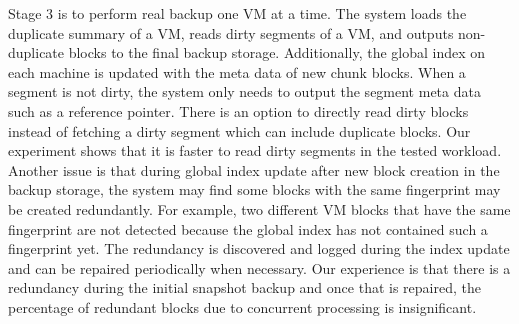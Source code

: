 Stage 3 is to perform real backup one VM at a time.
The system loads the duplicate summary of a VM, 
reads  dirty segments of a VM, and outputs non-duplicate blocks to the final backup 
storage. Additionally, the global index on each machine is updated with the meta data of new chunk blocks. 
When a segment is not dirty, the system only needs to output the segment meta data such as a reference pointer. 
There is an option to directly read dirty blocks instead of fetching a dirty segment which can include duplicate
blocks. Our experiment shows that it is faster to read dirty segments in the tested workload.
Another issue is that during global index update after new block creation in the backup storage,
the system  may find some  blocks with the same fingerprint may be 
created redundantly. For example, two different VM blocks that have the same  fingerprint are not detected
because  the  global index has not contained such a fingerprint yet. 
The redundancy is discovered and logged during the index update and can be repaired
periodically when necessary.  Our experience is that there is a redundancy during the initial snapshot backup and once 
that is repaired, the percentage of redundant blocks due to concurrent processing  is insignificant.




